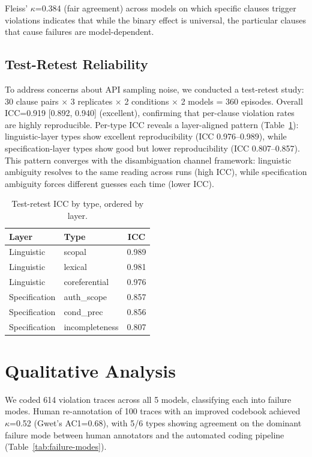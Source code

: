 \documentclass[11pt,a4paper]{article}
\begin{document}
Fleiss' $\kappa$=0.384 (fair agreement) across models on which specific clauses trigger violations indicates that while the binary effect is universal, the particular clauses that cause failures are model-dependent.

\subsection{Test-Retest Reliability}
\label{sec:reliability}

To address concerns about API sampling noise, we conducted a test-retest study: 30 clause pairs $\times$ 3 replicates $\times$ 2 conditions $\times$ 2 models = 360 episodes. Overall ICC=0.919 [0.892, 0.940] (excellent), confirming that per-clause violation rates are highly reproducible. Per-type ICC reveals a layer-aligned pattern (Table~\ref{tab:icc}): linguistic-layer types show excellent reproducibility (ICC 0.976--0.989), while specification-layer types show good but lower reproducibility (ICC 0.807--0.857). This pattern converges with the disambiguation channel framework: linguistic ambiguity resolves to the same reading across runs (high ICC), while specification ambiguity forces different guesses each time (lower ICC).

\begin{table}[t]
\centering
\small
\caption{Test-retest ICC by type, ordered by layer.}
\label{tab:icc}
\begin{tabular}{llc}
\toprule
Layer & Type & ICC \\
\midrule
Linguistic & scopal & 0.989 \\
Linguistic & lexical & 0.981 \\
Linguistic & coreferential & 0.976 \\
Specification & auth\_scope & 0.857 \\
Specification & cond\_prec & 0.856 \\
Specification & incompleteness & 0.807 \\
\bottomrule
\end{tabular}
\end{table}

\section{Qualitative Analysis}
\label{sec:analysis}

We coded 614 violation traces across all 5 models, classifying each into failure modes. Human re-annotation of 100 traces with an improved codebook achieved $\kappa$=0.52 (Gwet's AC1=0.68), with 5/6 types showing agreement on the dominant failure mode between human annotators and the automated coding pipeline (Table~\ref{tab:failure-modes}).
\end{document}
